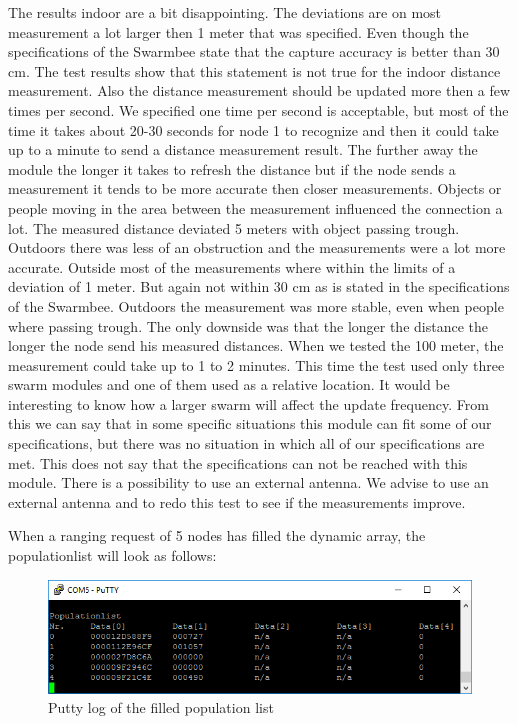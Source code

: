 \documentclass[10pt,a4paper]{article}
\begin{document}
The results indoor are a bit disappointing. The deviations are on most measurement a lot larger then 1 meter that was specified. Even though the specifications of the Swarmbee state that the capture accuracy is better than 30 cm. The test results show that this statement is not true for the indoor distance measurement. Also the distance measurement should be updated more then a few times  per second. We specified one time per second is acceptable, but most of the time it takes about 20-30 seconds for node 1 to recognize and then it could take up to a minute to send a distance measurement result. The further away the module the longer it takes to refresh the distance but if the node sends a measurement it tends to be more accurate then closer measurements. Objects or people moving in the area between the measurement influenced the connection a lot. The measured distance deviated 5 meters with object passing trough. Outdoors there was less of an obstruction and the measurements were a lot more accurate. Outside most of the measurements where within the limits of a deviation of 1 meter. But again not within 30 cm as is stated in the specifications of the Swarmbee. Outdoors the measurement was more stable, even when people where passing trough. The only downside was that the longer the distance the longer the node send his measured distances. When we tested the 100 meter, the measurement could take up to 1 to 2 minutes. This time the test used only three swarm modules and one of them used as a relative location. It would be interesting to know how a larger swarm will affect the update frequency. From this we can say that in some specific situations this module can fit some of our specifications, but there was no situation in which all of our specifications are met. This does not say that the specifications can not be reached with this module. There is a possibility to use an external antenna. We advise to use an external antenna and to redo this test to see if the measurements improve. 



When a ranging request of 5 nodes has filled the dynamic array, the populationlist will look as follows:
\begin{figure}[H]
  \centering
      \includegraphics[width=\textwidth]{populationlist.png}
  \caption{Putty log of the filled population list}
  \label{list}
\end{figure}
\end{document}
